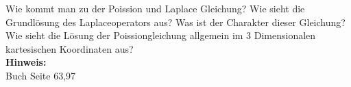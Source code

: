 \begin{question}[section=3,subsection=31,name={Poission und Laplace},difficulty=7,type=mdl,tags={}]
	Wie kommt man zu der Poission und Laplace Gleichung? Wie sieht die Grundlösung des Laplaceoperators aus? Was ist der Charakter dieser Gleichung? Wie sieht die Lösung der Poissiongleichung allgemein im 3 Dimensionalen kartesischen Koordinaten aus?
	\\ \textbf{Hinweis:}\\
	Buch Seite 63,97
\end{question}
\begin{solution}
	
\end{solution}